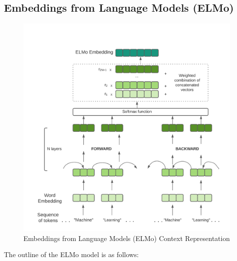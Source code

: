 \subsection{Embeddings from Language Models (ELMo)} \label{elmo}
\vspace{-4ex}

\begin{figure}[H]
\centering
\includegraphics[scale=0.15]{images/Elmo2.png}
\caption{Embeddings from Language Models (ELMo) Context Representation}
\end{figure}


The outline of the ELMo model is as follows:~\cite{context2vec}

